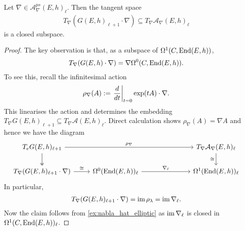 \documentclass[12pt]{ociamthesis}  %
\begin{document}
\begin{lemma}
  Let $\nabla\in \mathcal A^{ps}_\nabla(E,h)_{\ell}$. Then the tangent space
  \begin{align*}
    T_\nabla(G(E,h)_{\ell+1}\cdot\nabla) \subseteq T_\nabla\mathcal A_\nabla(E,h)_\ell
  \end{align*}
  is a closed subspace.
  \begin{proof}
    The key observation is that, as a subspace of
    $\Omega^1(C,\operatorname{End}(E,h))$,
    \begin{align*}
      T_\nabla (G(E,h)\cdot\nabla) = \nabla\Omega^0(C,\operatorname{End}(E,h)).
    \end{align*}
    To see this, recall the infinitesimal action
    \begin{align*}
      \rho_\nabla(A) := \left.{\frac{d}{dt}}\right\vert_{t=0} \exp(tA)\cdot\nabla.
    \end{align*}
    This linearises the action and determines the embedding
    $T_\nabla G(E,h)_{\ell+1}\subseteq T_\nabla \mathcal A(E,h)_\ell$.
    Direct calculation shows $\rho_\nabla(A) = \nabla A$
    and hence we have the diagram 
    \begin{equation*}
      \begin{tikzcd}
        {T_e G(E,h)_{\ell+1}} &&&& {T_\nabla\mathcal A_\nabla(E,h)_\ell} \\
        {T_\nabla(G(E,h)_{\ell+1}\cdot \nabla)} & {\Omega^0(\End(E,h))_\ell} &&& {\Omega^1(\End(E,h))_\ell}
        \arrow["{\rho_\nabla}", from=1-1, to=1-5]
        \arrow[two heads, from=1-1, to=2-1]
        \arrow["\cong"', from=1-5, to=2-5]
        \arrow["\cong", from=2-1, to=2-2]
        \arrow["{\nabla_\ell}", from=2-2, to=2-5]
      \end{tikzcd}
    \end{equation*}
    In particular,
    \begin{align*}
      T_\nabla(G(E,h)_{\ell+1}\cdot\nabla) = \operatorname{im}\rho_\lambda = \operatorname{im}\nabla_\ell.
    \end{align*}
    Now the claim follows from \ref{ex:nabla_hat_elliptic} as $\operatorname{im}\nabla_\ell$
    is closed in $\Omega^1(C,\operatorname{End}(E,h))_\ell$.
  \end{proof}
\end{lemma}
\end{document}
